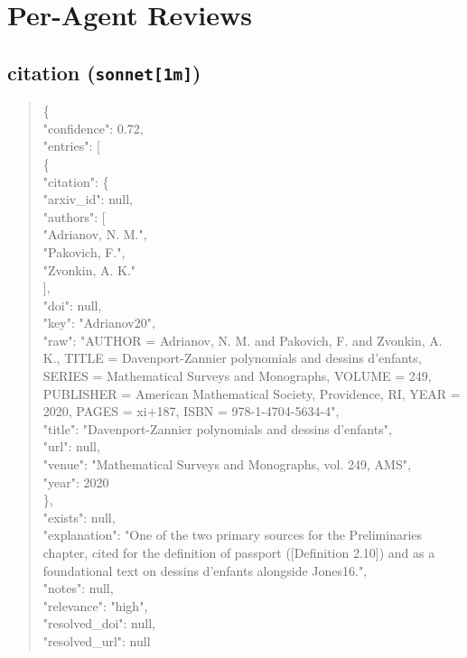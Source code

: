 \documentclass[11pt]{article}
\begin{document}
\section*{Per-Agent Reviews}
\subsection*{citation (\texttt{sonnet[1m]})}
\begin{quote}\small\ttfamily\raggedright
\{\\
  "confidence": 0.72,\\
  "entries": [\\
    \{\\
      "citation": \{\\
        "arxiv\_id": null,\\
        "authors": [\\
          "Adrianov, N. M.",\\
          "Pakovich, F.",\\
          "Zvonkin, A. K."\\
        ],\\
        "doi": null,\\
        "key": "Adrianov20",\\
        "raw": "AUTHOR = Adrianov, N. M. and Pakovich, F. and Zvonkin, A. K., TITLE = Davenport-Zannier polynomials and dessins d'enfants, SERIES = Mathematical Surveys and Monographs, VOLUME = 249, PUBLISHER = American Mathematical Society, Providence, RI, YEAR = 2020, PAGES = xi+187, ISBN = 978-1-4704-5634-4",\\
        "title": "Davenport-Zannier polynomials and dessins d'enfants",\\
        "url": null,\\
        "venue": "Mathematical Surveys and Monographs, vol. 249, AMS",\\
        "year": 2020\\
      \},\\
      "exists": null,\\
      "explanation": "One of the two primary sources for the Preliminaries chapter, cited for the definition of passport ([Definition 2.10]) and as a foundational text on dessins d'enfants alongside Jones16.",\\
      "notes": null,\\
      "relevance": "high",\\
      "resolved\_doi": null,\\
      "resolved\_url": null\\

\end{quote}
\end{document}
